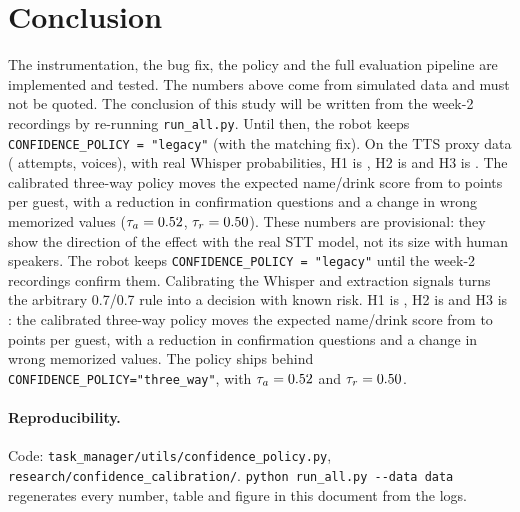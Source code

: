 \documentclass[10pt,a4paper]{article}
\newcommand{\code}[1]{\texttt{#1}}
\begin{document}
\section{Conclusion}
\ifnum{}
The instrumentation, the bug fix, the policy and the full evaluation pipeline are implemented and tested.
The numbers above come from simulated data and must not be quoted. The conclusion of this study will be
written from the week-2 recordings by re-running \code{run\_all.py}. Until then, the robot keeps
\code{CONFIDENCE\_POLICY = "legacy"} (with the matching fix).
\else\ifnum{}
On the TTS proxy data (\WTwoAttempts{} attempts, \WTwoSpeakers{} voices), with real Whisper probabilities,
H1 is \HOneVerdict, H2 is \HTwoVerdict{} and H3 is \HThreeVerdict. The calibrated three-way policy moves the
expected name/drink score from \HThreeScoreLegacy{} to \HThreeScoreBest{} points per guest, with a
\HThreeConfirmReduction{} reduction in confirmation questions and a \HThreeWrongDelta{} change in wrong
memorized values ($\tau_a=0.52$, $\tau_r=0.50$). These numbers are provisional: they show the
direction of the effect with the real STT model, not its size with human speakers. The robot keeps
\code{CONFIDENCE\_POLICY = "legacy"} until the week-2 recordings confirm them.
\else
Calibrating the Whisper and extraction signals turns the arbitrary 0.7/0.7 rule into a decision with known
risk. H1 is \HOneVerdict, H2 is \HTwoVerdict{} and H3 is \HThreeVerdict{}: the calibrated three-way policy
moves the expected name/drink score from \HThreeScoreLegacy{} to \HThreeScoreBest{} points per guest, with
a \HThreeConfirmReduction{} reduction in confirmation questions and a \HThreeWrongDelta{} change in wrong memorized
values. The policy ships behind \code{CONFIDENCE\_POLICY="three\_way"}, with $\tau_a=0.52$ and
$\tau_r=0.50$.
\fi\fi

\paragraph{Reproducibility.} Code: \code{task\_manager/utils/confidence\_policy.py},
\code{research/confidence\_calibration/}. \code{python run\_all.py -{}-data data} regenerates every number,
table and figure in this document from the logs.



\end{document}
